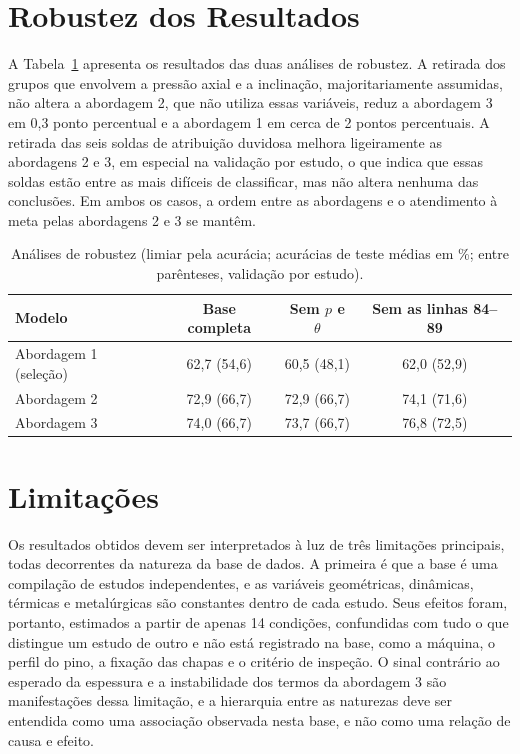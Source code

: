 \documentclass[12pt,openany]{report}
\begin{document}
\section{Robustez dos Resultados}
\label{sec:robustez}

A Tabela~\ref{tab:robustez} apresenta os resultados das duas análises de robustez. A retirada dos grupos que envolvem a pressão axial e a inclinação, majoritariamente assumidas, não altera a abordagem 2, que não utiliza essas variáveis, reduz a abordagem 3 em 0,3 ponto percentual e a abordagem 1 em cerca de 2 pontos percentuais. A retirada das seis soldas de atribuição duvidosa melhora ligeiramente as abordagens 2 e 3, em especial na validação por estudo, o que indica que essas soldas estão entre as mais difíceis de classificar, mas não altera nenhuma das conclusões. Em ambos os casos, a ordem entre as abordagens e o atendimento à meta pelas abordagens 2 e 3 se mantêm.

\begin{table}[htbp]
\centering
\caption{Análises de robustez (limiar pela acurácia; acurácias de teste médias em \%; entre parênteses, validação por estudo).}
\label{tab:robustez}
\small
\begin{tabular}{lccc}
\toprule
\textbf{Modelo} & \textbf{Base completa} & \textbf{Sem $p$ e $\theta$} & \textbf{Sem as linhas 84--89} \\ \midrule
Abordagem 1 (seleção) & 62,7 (54,6) & 60,5 (48,1) & 62,0 (52,9) \\
Abordagem 2 & 72,9 (66,7) & 72,9 (66,7) & 74,1 (71,6) \\
Abordagem 3 & 74,0 (66,7) & 73,7 (66,7) & 76,8 (72,5) \\ \bottomrule
\end{tabular}
\end{table}

\section{Limitações}
\label{sec:limitacoes}

Os resultados obtidos devem ser interpretados à luz de três limitações principais, todas decorrentes da natureza da base de dados. A primeira é que a base é uma compilação de estudos independentes, e as variáveis geométricas, dinâmicas, térmicas e metalúrgicas são constantes dentro de cada estudo. Seus efeitos foram, portanto, estimados a partir de apenas 14 condições, confundidas com tudo o que distingue um estudo de outro e não está registrado na base, como a máquina, o perfil do pino, a fixação das chapas e o critério de inspeção. O sinal contrário ao esperado da espessura e a instabilidade dos termos da abordagem 3 são manifestações dessa limitação, e a hierarquia entre as naturezas deve ser entendida como uma associação observada nesta base, e não como uma relação de causa e efeito.
\end{document}
